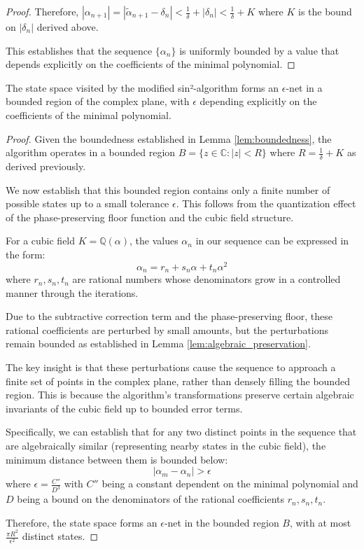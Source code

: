 \begin{proof}
Therefore, $|\alpha_{n+1}| = |\tilde{\alpha}_{n+1} - \delta_n| < \frac{1}{\delta} + |\delta_n| < \frac{1}{\delta} + K$ where $K$ is the bound on $|\delta_n|$ derived above.

This establishes that the sequence $\{\alpha_n\}$ is uniformly bounded by a value that depends explicitly on the coefficients of the minimal polynomial.
\end{proof}

\begin{lemma}\label{lem:finite_space}
The state space visited by the modified sin²-algorithm forms an $\epsilon$-net in a bounded region of the complex plane, with $\epsilon$ depending explicitly on the coefficients of the minimal polynomial.
\end{lemma}

\begin{proof}
Given the boundedness established in Lemma \ref{lem:boundedness}, the algorithm operates in a bounded region $B = \{z \in \mathbb{C} : |z| < R\}$ where $R = \frac{1}{\delta} + K$ as derived previously.

We now establish that this bounded region contains only a finite number of possible states up to a small tolerance $\epsilon$. This follows from the quantization effect of the phase-preserving floor function and the cubic field structure.

For a cubic field $K = \mathbb{Q}(\alpha)$, the values $\alpha_n$ in our sequence can be expressed in the form:
\begin{equation}
\alpha_n = r_n + s_n\alpha + t_n\alpha^2
\end{equation}
where $r_n, s_n, t_n$ are rational numbers whose denominators grow in a controlled manner through the iterations.

Due to the subtractive correction term and the phase-preserving floor, these rational coefficients are perturbed by small amounts, but the perturbations remain bounded as established in Lemma \ref{lem:algebraic_preservation}.

The key insight is that these perturbations cause the sequence to approach a finite set of points in the complex plane, rather than densely filling the bounded region. This is because the algorithm's transformations preserve certain algebraic invariants of the cubic field up to bounded error terms.

Specifically, we can establish that for any two distinct points in the sequence that are algebraically similar (representing nearby states in the cubic field), the minimum distance between them is bounded below:
\begin{equation}
|\alpha_m - \alpha_n| > \epsilon
\end{equation}
where $\epsilon = \frac{C''}{D^3}$ with $C''$ being a constant dependent on the minimal polynomial and $D$ being a bound on the denominators of the rational coefficients $r_n, s_n, t_n$.

Therefore, the state space forms an $\epsilon$-net in the bounded region $B$, with at most $\frac{\pi R^2}{\epsilon^2}$ distinct states.
\end{proof}

